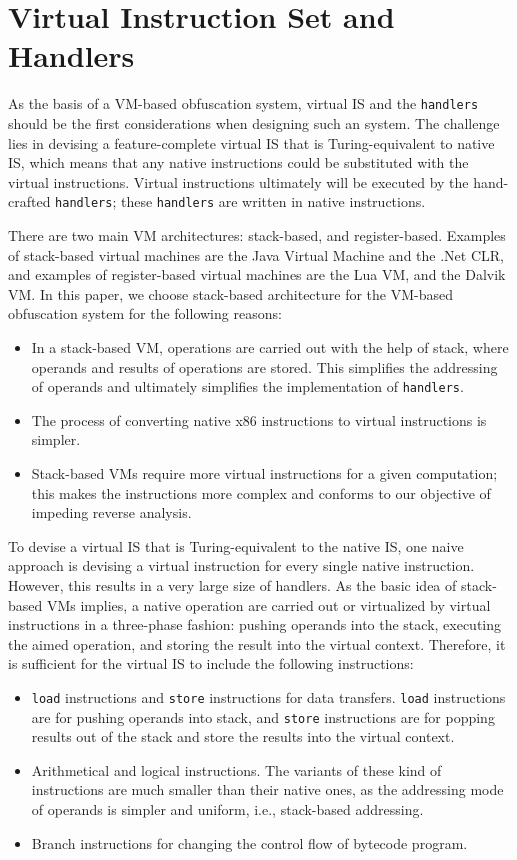 \section{Virtual Instruction Set and Handlers}\label{sec:VIS-Handlers}
As the basis of a VM-based obfuscation system, virtual IS and the \texttt{handlers} should be the first considerations when designing such an system. The challenge lies in devising a feature-complete virtual IS that is Turing-equivalent to native IS, which means that any native instructions could be substituted with the virtual instructions. Virtual instructions ultimately will be executed by the hand-crafted \texttt{handlers}; these \texttt{handlers} are written in native instructions.

There are two main VM architectures: stack-based, and register-based. Examples of stack-based virtual machines are the Java Virtual Machine and the .Net CLR, and examples of register-based virtual machines are the Lua VM, and the Dalvik VM. In this paper, we choose stack-based architecture for the VM-based obfuscation system for the following reasons:
\begin{itemize}
  \item In a stack-based VM, operations are carried out with the help of stack, where operands and results of operations are stored. This simplifies the addressing of operands and ultimately simplifies the implementation of \texttt{handlers}.
  \item The process of converting native x86 instructions to virtual instructions is simpler.
  \item Stack-based VMs require more virtual instructions for a given computation; this makes the instructions more complex and conforms to our objective of impeding reverse analysis.
\end{itemize}

To devise a virtual IS that is Turing-equivalent to the native IS, one naive approach is devising a virtual instruction for every single native instruction. However, this results in a very large size of handlers. As the basic idea of stack-based VMs implies, a native operation are carried out or virtualized by virtual instructions in a three-phase fashion: pushing operands into the stack, executing the aimed operation, and storing the result into the virtual context. Therefore, it is sufficient for the virtual IS to include the following instructions:
\begin{itemize}
  \item \texttt{load} instructions and \texttt{store} instructions for data transfers. \texttt{load} instructions are for pushing operands into stack, and \texttt{store} instructions are for popping results out of the stack and store the results into the virtual context.
  \item Arithmetical and logical instructions. The variants of these kind of instructions are much smaller than their native ones, as the addressing mode of operands is simpler and uniform, i.e., stack-based addressing.
  \item Branch instructions for changing the control flow of bytecode program.
\end{itemize}


